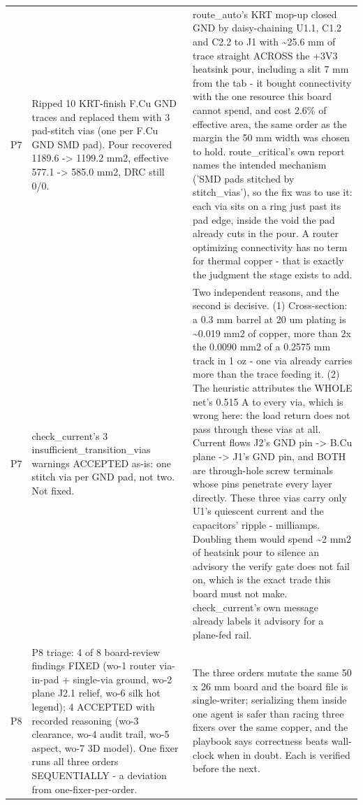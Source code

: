 \documentclass[11pt,a4paper]{article}
\begin{document}
{\begin{longtable}{lp{5.2cm}p{7.2cm}}
P7 & Ripped 10 KRT-finish F.Cu GND traces and replaced them with 3 pad-stitch vias (one per F.Cu GND SMD pad). Pour recovered 1189.6 -\textgreater{} 1199.2 mm2, effective 577.1 -\textgreater{} 585.0 mm2, DRC still 0/0. & route\_auto's KRT mop-up closed GND by daisy-chaining U1.1, C1.2 and C2.2 to J1 with \textasciitilde{}25.6 mm of trace straight ACROSS the +3V3 heatsink pour, including a slit 7 mm from the tab - it bought connectivity with the one resource this board cannot spend, and cost 2.6\% of effective area, the same order as the margin the 50 mm width was chosen to hold. route\_critical's own report names the intended mechanism ('SMD pads stitched by stitch\_vias'), so the fix was to use it: each via sits on a ring just past its pad edge, inside the void the pad already cuts in the pour. A router optimizing connectivity has no term for thermal copper - that is exactly the judgment the stage exists to add. \\
P7 & check\_current's 3 insufficient\_transition\_vias warnings ACCEPTED as-is: one stitch via per GND pad, not two. Not fixed. & Two independent reasons, and the second is decisive. (1) Cross-section: a 0.3 mm barrel at 20 um plating is \textasciitilde{}0.019 mm2 of copper, more than 2x the 0.0090 mm2 of a 0.2575 mm track in 1 oz - one via already carries more than the trace feeding it. (2) The heuristic attributes the WHOLE net's 0.515 A to every via, which is wrong here: the load return does not pass through these vias at all. Current flows J2's GND pin -\textgreater{} B.Cu plane -\textgreater{} J1's GND pin, and BOTH are through-hole screw terminals whose pins penetrate every layer directly. These three vias carry only U1's quiescent current and the capacitors' ripple - milliamps. Doubling them would spend \textasciitilde{}2 mm2 of heatsink pour to silence an advisory the verify gate does not fail on, which is the exact trade this board must not make. check\_current's own message already labels it advisory for a plane-fed rail. \\
P8 & P8 triage: 4 of 8 board-review findings FIXED (wo-1 router via-in-pad + single-via ground, wo-2 plane J2.1 relief, wo-6 silk hot legend); 4 ACCEPTED with recorded reasoning (wo-3 clearance, wo-4 audit trail, wo-5 aspect, wo-7 3D model). One fixer runs all three orders SEQUENTIALLY - a deviation from one-fixer-per-order. & The three orders mutate the same 50 x 26 mm board and the board file is single-writer; serializing them inside one agent is safer than racing three fixers over the same copper, and the playbook says correctness beats wall-clock when in doubt. Each is verified before the next. \\

\end{longtable}}
\end{document}
